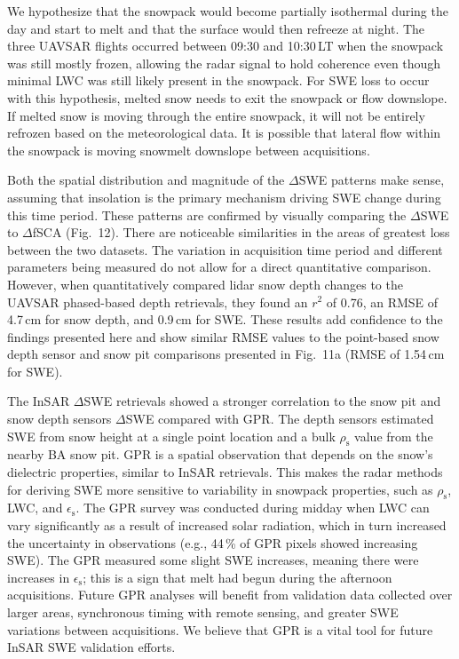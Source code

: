 We hypothesize that the snowpack would become partially isothermal during the day and start to melt and that the surface would then refreeze at night. The three UAVSAR flights occurred between 09:30 and 10:30\,LT when the snowpack was still mostly frozen, allowing the radar signal to hold coherence even though minimal LWC was still likely present in the snowpack. For SWE loss to occur with this hypothesis, melted snow needs to exit the snowpack or flow downslope. If melted snow is moving through the entire snowpack, it will not be entirely refrozen based on the meteorological data. It is possible that lateral flow within the snowpack \citep{webbTwodimensionalLiquidWater2021,eirikssonEvaluationHydrologicRelevance2013a, evansIsotopicEvidenceLateral2016} is moving snowmelt downslope between acquisitions.


Both the spatial distribution and magnitude of the $\Delta$SWE patterns make sense, assuming that insolation is the primary mechanism driving SWE change during this time period. These patterns are confirmed by visually comparing the $\Delta$SWE to $\Delta$fSCA (Fig.~12). There are noticeable similarities in the areas of greatest loss between the two datasets. The variation in acquisition time period and different parameters being measured do not allow for a direct quantitative comparison. However, when \citet{marshallLBandInSARDepth2021} quantitatively compared lidar snow depth changes to the UAVSAR phased-based depth retrievals, they found an $r^{2}$ of 0.76, an RMSE of 4.7\,cm for snow depth, and 0.9\,cm for SWE. These results add confidence to the findings presented here and show similar RMSE values to the point-based snow depth sensor and snow pit comparisons presented in Fig.~11a (RMSE of 1.54\,cm for SWE).


The InSAR $\Delta$SWE retrievals showed a stronger correlation to the snow pit and snow depth sensors $\Delta$SWE compared with GPR. The depth sensors estimated SWE from snow height at a single point location and a bulk $\rho_\mathrm{s}$ value from the nearby BA snow pit. GPR is a spatial observation that depends on the snow's dielectric properties, similar to InSAR retrievals. This makes the radar methods for deriving SWE more sensitive to variability in snowpack properties, such as $\rho_\mathrm{s}$, LWC, and $\epsilon_\mathrm{s}$. The GPR survey was conducted during midday when LWC can vary significantly as a result of increased solar radiation, which in turn increased the uncertainty in observations (e.g., 44\,\% of GPR pixels showed increasing SWE). The GPR measured some slight SWE increases, meaning there were increases in $\epsilon_\mathrm{s}$; this is a sign that melt had begun during the afternoon acquisitions. Future GPR analyses will benefit from validation data collected over larger areas, synchronous timing with remote sensing, and greater SWE variations between acquisitions. We believe that GPR is a vital tool for future InSAR SWE validation efforts.


